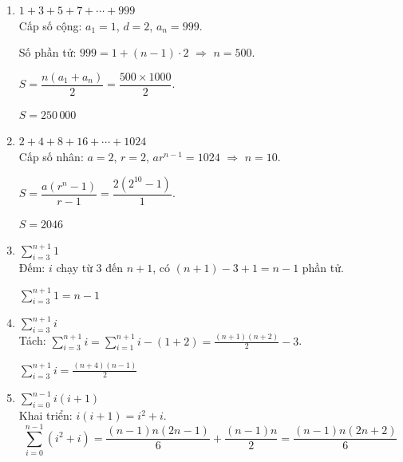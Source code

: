 \documentclass[12pt,a4paper]{article}
\begin{document}
\begin{enumerate}[label=\textbf{\alph*.}]

  \item $1 + 3 + 5 + 7 + \cdots + 999$ \\[4pt]
  Cấp số cộng: $a_1 = 1$, $d = 2$, $a_n = 999$.

  Số phần tử: $999 = 1 + (n-1) \cdot 2$ $\Rightarrow$ $n = 500$.

  $S = \dfrac{n(a_1 + a_n)}{2} = \dfrac{500 \times 1000}{2}$.

  \begin{resultbox}
  $S = 250\,000$
  \end{resultbox}

  \bigskip

  \item $2 + 4 + 8 + 16 + \cdots + 1024$ \\[4pt]
  Cấp số nhân: $a = 2$, $r = 2$, $ar^{n-1} = 1024$ $\Rightarrow$ $n = 10$.

  $S = \dfrac{a(r^n - 1)}{r - 1} = \dfrac{2(2^{10} - 1)}{1}$.

  \begin{resultbox}
  $S = 2046$
  \end{resultbox}

  \bigskip

  \item $\displaystyle\sum_{i=3}^{n+1} 1$ \\[4pt]
  Đếm: $i$ chạy từ $3$ đến $n+1$, có $(n+1) - 3 + 1 = n - 1$ phần tử.

  \begin{resultbox}
  $\displaystyle\sum_{i=3}^{n+1} 1 = n - 1$
  \end{resultbox}

  \bigskip

  \item $\displaystyle\sum_{i=3}^{n+1} i$ \\[4pt]
  Tách: $\displaystyle\sum_{i=3}^{n+1} i = \sum_{i=1}^{n+1} i - (1+2) = \frac{(n+1)(n+2)}{2} - 3$.

  \begin{resultbox}
  $\displaystyle\sum_{i=3}^{n+1} i = \frac{(n+4)(n-1)}{2}$
  \end{resultbox}

  \bigskip

  \item $\displaystyle\sum_{i=0}^{n-1} i(i+1)$ \\[4pt]
  Khai triển: $i(i+1) = i^2 + i$.
  \[
    \sum_{i=0}^{n-1}(i^2 + i) = \frac{(n-1)n(2n-1)}{6} + \frac{(n-1)n}{2}
    = \frac{(n-1)n(2n+2)}{6}
  \]


\end{enumerate}
\end{document}
